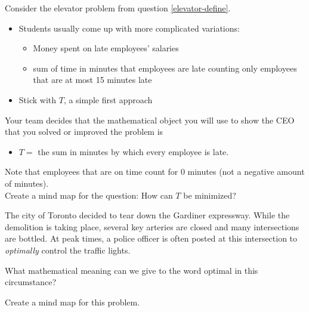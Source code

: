 

\question
\label{elevatorR}
Consider the elevator problem from question \ref{elevator-define}.


\begin{annotation}
	\begin{notes}
	\begin{itemize}
		\item Students usually come up with more complicated variations:
		\begin{itemize}
			\item Money spent on late employees' salaries
			\item sum of time in minutes that employees are late counting only employees that are at most 15 minutes late
		\end{itemize}
		\item Stick with $T$, a simple first approach
	\end{itemize}	
	\end{notes}
	
\end{annotation}
Your team decides that the mathematical object you will use to show the CEO that you solved or improved the problem is
\begin{itemize}
	\item $T=$ the sum in minutes by which every employee is late.
\end{itemize}

Note that employees that are on time count for 0 minutes (not a negative amount of minutes). \\

Create a mind map for the question: \quad How can $T$ be minimized?


\bookonlynewpage


\question

The city of Toronto decided to tear down the Gardiner expressway. While the demolition is taking place, several key arteries are closed and many intersections are bottled. 
At peak times, a police officer is often posted at this intersection to \emph{optimally} control the traffic lights. 

\begin{parts}
	\item What mathematical meaning can we give to the word optimal in this circumstance? 
	\item Create a mind map for this problem.
\end{parts}




